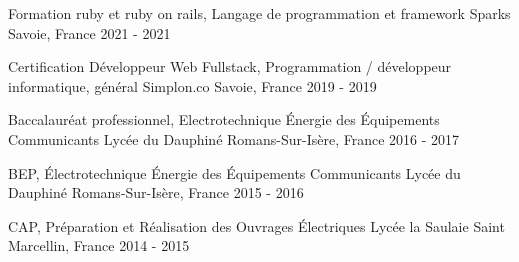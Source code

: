 
\begin{cventries}
  \cventry
    {Formation ruby et ruby on rails, Langage de programmation et framework}
    {Sparks}
    {Savoie, France}
    {2021 - 2021}
    {}

  \cventry
    {Certification Développeur Web Fullstack, Programmation / développeur informatique, général}
    {Simplon.co}
    {Savoie, France}
    {2019 - 2019}
    {}

  \cventry
    {Baccalauréat professionnel, Electrotechnique Énergie des Équipements Communicants}
    {Lycée du Dauphiné}
    {Romans-Sur-Isère, France}
    {2016 - 2017}
    {}

  \cventry
    {BEP, Électrotechnique Énergie des Équipements Communicants}
    {Lycée du Dauphiné}
    {Romans-Sur-Isère, France}
    {2015 - 2016}
    {}

  \cventry
    {CAP, Préparation et Réalisation des Ouvrages Électriques}
    {Lycée la Saulaie}
    {Saint Marcellin, France}
    {2014 - 2015}
    {}
\end{cventries}
